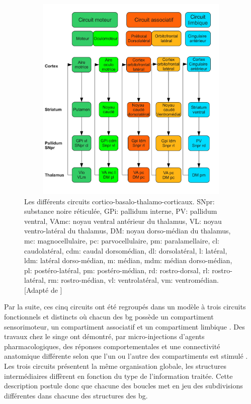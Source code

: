 \begin{figure}
  \begin{center}
    \includegraphics[width=14cm,height=10cm]{figures/ch4_3_circuits}
  \end{center}
  \caption {Les différents circuits cortico-basalo-thalamo-corticaux. SNpr: substance noire réticulée, GPi: pallidum interne, PV: pallidum ventral, VAmc: noyau ventral antérieur du thalamus, VL: noyau ventro-latéral du thalamus, DM: noyau dorso-médian du thalamus, mc: magnocellulaire, pc: parvocellulaire, pm: paralamellaire, cl: caudolatéral, cdm: caudal dorsomédian, dl: dorsolatéral, l: latéral, ldm: latéral dorso-médian, m: médian, mdm: médian dorso-médian, pl: postéro-latéral, pm: postéro-médian, rd: rostro-dorsal, rl: rostro-latéral, rm: rostro-médian, vl: ventrolatéral, vm: ventromédian. [Adapté de \protect\cite{Alexander:1986}]}
  \label{circuits}
\end{figure}


Par la suite, ces cinq circuits ont été regroupés dans un modèle à trois circuits fonctionnels et distincts où chacun des \gls{bg} possède un compartiment sensorimoteur, un compartiment associatif et un compartiment limbique \cite{Parent:1990, Parent:1993,Joel:1994}. Des travaux chez le singe ont démontré, par micro-injections d'agents pharmacologiques, des réponses comportementales et une connectivité anatomique différente selon que l'un ou l'autre des compartiments est stimulé \cite{Grabli:2004}. Les trois circuits présentent la même organisation globale, les structures intermédiaires diffèrent en fonction du type de l'information traitée. Cette description postule donc que chacune des boucles met en jeu des subdivisions différentes dans chacune des structures des \gls{bg}. \\ 

